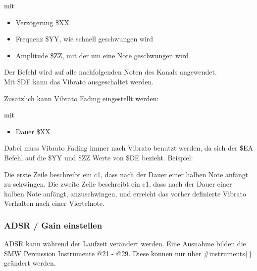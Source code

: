 mit

\begin{itemize}
	\item Verzögerung \$XX
	\item Frequenz  \$YY, wie schnell geschwungen wird
	\item Amplitude \$ZZ, mit der um eine Note geschwungen wird
\end{itemize}

Der Befehl wird auf alle nachfolgenden Noten des Kanals angewendet. \\
Mit \$DF kann das Vibrato ausgeschaltet werden.

\bigskip

Zusätzlich kann Vibrato Fading eingestellt werden:

\medskip



\medskip

mit

\begin{itemize}
	\item Dauer \$XX
\end{itemize}

Dabei muss Vibrato Fading immer nach Vibrato benutzt werden, da sich der \$EA Befehl auf die \$YY und \$ZZ Werte von \$DE bezieht. Beispiel:

\medskip



\medskip

Die erste Zeile beschreibt ein c1, dass nach der Dauer einer halben Note anfängt zu schwingen.
Die zweite Zeile beschreibt ein c1, dass nach der Dauer einer halben Note anfängt, anzuschwingen,
und erreicht das vorher definierte Vibrato Verhalten nach einer Viertelnote.


\subsubsection{ADSR / Gain einstellen}

ADSR kann während der Laufzeit verändert werden. Eine Ausnahme bilden die SMW Percussion Instrumente @21 - @29. Diese können nur über \#instruments\{\} geändert werden.

\medskip

